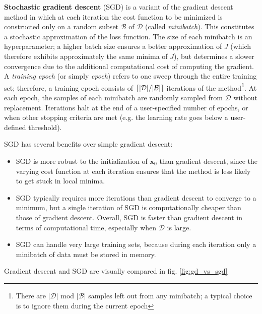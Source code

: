 \textbf{Stochastic gradient descent} (SGD) \cite{sgd} is a variant of the gradient descent method in which at each iteration the cost function to be minimized is constructed only on a random subset $\mathcal{B}$ of $\mathcal{D}$ (called \textit{minibatch}). This constitutes a stochastic approximation of the loss function. The size of each minibatch is an hyperparameter; a higher batch size ensures a better approximation of $J$ (which therefore exhibits approximately the same minima of $J$), but determines a slower convergence due to the additional computational cost of computing the gradient. A \textit{training epoch} (or simply \textit{epoch}) refers to one sweep through the entire training set; therefore, a training epoch consists of $\lceil|\mathcal{D}|/|\mathcal{B}|\rceil$ iterations of the method\footnote{There are $|\mathcal{D}|$ mod $|\mathcal{B}|$ samples left out from any minibatch; a typical choice is to ignore them during the current epoch}. At each epoch, the samples of each minibatch are randomly sampled from $\mathcal{D}$ without replacement. Iterations halt at the end of a user-specified number of epochs, or when other stopping criteria are met (e.g. the learning rate goes below a user-defined threshold).

SGD has several benefits over simple gradient descent:
\begin{itemize}
    \item SGD is more robust to the initialization of $\mathbf{x}_0$ than gradient descent, since the varying cost function at each iteration ensures that the method is less likely to get stuck in local minima.
    \item SGD typically requires more iterations than gradient descent to converge to a minimum, but a single iteration of SGD is computationally cheaper than those of gradient descent. Overall, SGD is faster than gradient descent in terms of computational time, especially when $\mathcal{D}$ is large.
    \item SGD can handle very large training sets, because during each iteration only a minibatch of data must be stored in memory.
\end{itemize}

Gradient descent and SGD are visually compared in fig. \ref{fig:gd_vs_sgd}


